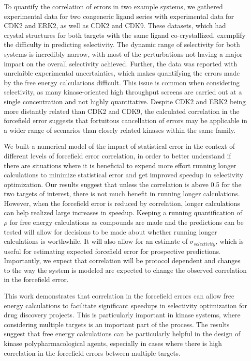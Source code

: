 \documentclass[9pt,lineno]{elife-modified} %
\begin{document}
To quantify the correlation of errors in two example systems, we gathered experimental data for two congeneric ligand series with experimental data for CDK2 and ERK2, as well as CDK2 and CDK9. These datasets, which had crystal structures for both targets with the same ligand co-crystallized, exemplify the difficulty in predicting selectivity. The dynamic range of selectivity for both systems is incredibly narrow, with most of the perturbations not having a major impact on the overall selectivity achieved. Further, the data was reported with unrelaible experimental uncertainties, which makes quantifying the errors made by the free energy calculations difficult. This issue is common when considering selectivity, as many kinase-oriented high throughput screens are carried out at a single concentration and not highly quantitative. Despite CDK2 and ERK2 being more distantly related than CDK2 and CDK9, the calculated correlation in the forcefield error suggests that fortuitous cancellation of errors may be applicable in a wider range of scenarios than closely related kinases within the same family. 

We built a numerical model of the impact of statistical error in the context of different levels of forcefield error correlation, in order to better understand if there are situations where it is beneficial to expend more effort running longer calculations to minimize statistical error and get improved speedup in selectivity optimization. Our results suggest that unless the correlation is above 0.5 for the two targets of interest, there is not much benefit in running longer calculations. However, when the forcefield error is reduced by correlation, longer calculations can help realized large increases in speedup. Keeping a running quantification of $\rho$ for free energy calculations as compounds are made and the predictions can be tested will allow for decisions to be made about whether running longer calculations is worthwhile. It will also allow for an estimate of $\sigma_{selectivity}$, which is useful for estimating expected forcefield error for prospective predictions. Importantly, we expect that correlation will be protocol dependent and changes to the way the system is modeled are expected to change the observed correlation in the forcefield error. 

This work demonstrates that correlation in the forcefield errors can allow free energy calculations to facilitate significant speedups in selectivity optimization for drug discovery projects. This is particularly important in kinase systems, where considering multiple targets is an important part of the process. The results suggest that free energy calculations can be particularly helpful in the design of kinase polypharmacological agents, especially in cases where there is high correlation in the forcefield errors between multiple targets. 
\end{document}
